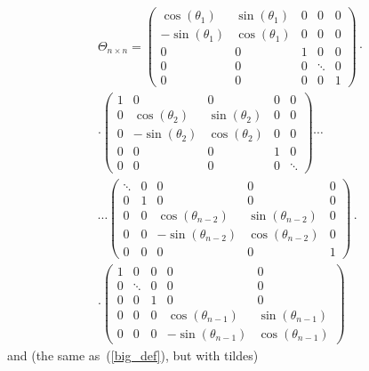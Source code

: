 \documentclass[letterpaper,12pt]{article}
\begin{document}
\begin{multline}
\label{big_def}
\Theta_{n \times n} =
\left( \begin{array}{ccccc}
 \cos(\theta_1) & \sin(\theta_1) & 0 &      0 & 0 \\
-\sin(\theta_1) & \cos(\theta_1) & 0 &      0 & 0 \\
              0 &              0 & 1 &      0 & 0 \\
              0 &              0 & 0 & \ddots & 0 \\
              0 &              0 & 0 &      0 & 1
\end{array} \right) \cdot \\
\cdot \left( \begin{array}{ccccc}
 1 &               0 &              0 & 0 & 0 \\
 0 &  \cos(\theta_2) & \sin(\theta_2) & 0 & 0 \\
 0 & -\sin(\theta_2) & \cos(\theta_2) & 0 & 0 \\
 0 &               0 &              0 & 1 & 0 \\
 0 &               0 &              0 & 0 & \ddots
\end{array} \right) \cdots \\
\cdots \left( \begin{array}{ccccc}
\ddots & 0 &                   0 &                  0 & 0 \\
     0 & 1 &                   0 &                  0 & 0 \\
     0 & 0 &  \cos(\theta_{n-2}) & \sin(\theta_{n-2}) & 0 \\
     0 & 0 & -\sin(\theta_{n-2}) & \cos(\theta_{n-2}) & 0 \\
     0 & 0 &                   0 &                  0 & 1
\end{array} \right) \cdot \\
\cdot \left( \begin{array}{ccccc}
1 &      0 & 0 &                   0 &                  0 \\
0 & \ddots & 0 &                   0 &                  0 \\
0 &      0 & 1 &                   0 &                  0 \\
0 &      0 & 0 &  \cos(\theta_{n-1}) & \sin(\theta_{n-1}) \\
0 &      0 & 0 & -\sin(\theta_{n-1}) & \cos(\theta_{n-1})
\end{array} \right)
\end{multline}
and (the same as~(\ref{big_def}), but with tildes)
\end{document}
